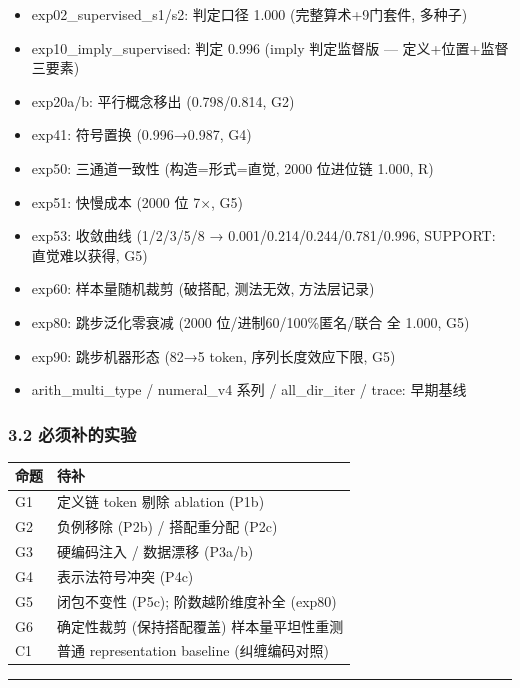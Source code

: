 \documentclass[
]{article}
\providecommand{\tightlist}{%
  \setlength{\itemsep}{0pt}\setlength{\parskip}{0pt}}
\begin{document}
\begin{itemize}
\tightlist
\item
  exp02\_supervised\_s1/s2: 判定口径 1.000 (完整算术+9门套件, 多种子)
\item
  exp10\_imply\_supervised: 判定 0.996 (imply 判定监督版 ---
  定义+位置+监督三要素)
\item
  exp20a/b: 平行概念移出 (0.798/0.814, G2)
\item
  exp41: 符号置换 (0.996→0.987, G4)
\item
  exp50: 三通道一致性 (构造=形式=直觉, 2000 位进位链 1.000, R)
\item
  exp51: 快慢成本 (2000 位 7×, G5)
\item
  exp53: 收敛曲线 (1/2/3/5/8 → 0.001/0.214/0.244/0.781/0.996, SUPPORT:
  直觉难以获得, G5)
\item
  exp60: 样本量随机裁剪 (破搭配, 测法无效, 方法层记录)
\item
  exp80: 跳步泛化零衰减 (2000 位/进制60/100\%匿名/联合 全 1.000, G5)
\item
  exp90: 跳步机器形态 (82→5 token, 序列长度效应下限, G5)
\item
  arith\_multi\_type / numeral\_v4 系列 / all\_dir\_iter / trace:
  早期基线
\end{itemize}

\subsubsection{3.2
必须补的实验}\label{ux5fc5ux987bux8865ux7684ux5b9eux9a8c}

\begin{longtable}[]{@{}ll@{}}
\toprule\noalign{}
命题 & 待补 \\
\midrule\noalign{}
\endhead
\bottomrule\noalign{}
\endlastfoot
G1 & 定义链 token 剔除 ablation (P1b) \\
G2 & 负例移除 (P2b) / 搭配重分配 (P2c) \\
G3 & 硬编码注入 / 数据漂移 (P3a/b) \\
G4 & 表示法符号冲突 (P4c) \\
G5 & 闭包不变性 (P5c); 阶数越阶维度补全 (exp80) \\
G6 & 确定性裁剪 (保持搭配覆盖) 样本量平坦性重测 \\
C1 & 普通 representation baseline (纠缠编码对照) \\
\end{longtable}

\begin{center}\rule{0.5\linewidth}{0.5pt}\end{center}
\end{document}
